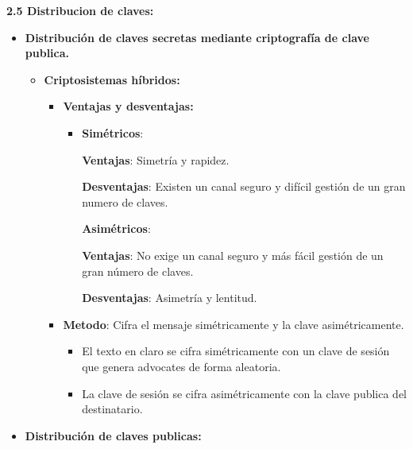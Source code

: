\documentclass[12pt, twoside, openright]{report} %
\begin{document}
  
  \textbf{2.5 Distribucion de claves:}
  

  \begin{itemize}
  \item \textbf{Distribución de claves secretas mediante criptografía de
    clave publica.}
    

    \begin{itemize}
    \item \textbf{Criptosistemas híbridos:}
      

      \begin{itemize}
      \item \textbf{Ventajas y desventajas:}
        

        \begin{itemize}
        \item \textbf{Simétricos}:
          

          
		  
            \textbf{Ventajas}: Simetría y rapidez.
        
			
            \textbf{Desventajas}: Existen un canal seguro y difícil
            gestión de un gran numero de claves.
       
			
          \textbf{Asimétricos}:
        
		  
            \textbf{Ventajas}: No exige un canal seguro y más fácil
            gestión de un gran número de claves.
          
			
            \textbf{Desventajas}: Asimetría y lentitud.
           
			
        \end{itemize}
      \item \textbf{Metodo}: Cifra el mensaje simétricamente y la clave
        asimétricamente.
        

        \begin{itemize}
        \item El texto en claro se cifra simétricamente con un clave de
          sesión que genera advocates de forma aleatoria.
          
        \item La clave de sesión se cifra asimétricamente con la clave
          publica del destinatario.
          
        \end{itemize}
      \end{itemize}
    \end{itemize}
  \item \textbf{Distribución de claves publicas:}
    


\end{itemize}
\end{document}
